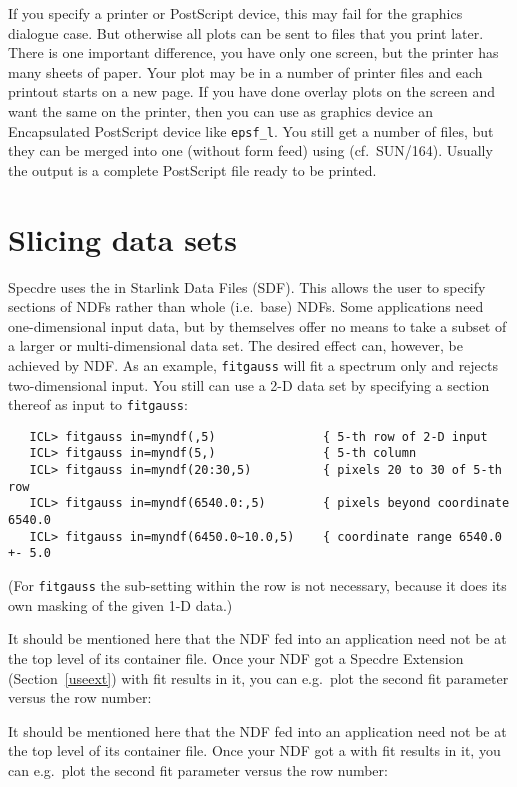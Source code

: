    If you specify a printer or PostScript device, this may fail for the
   graphics dialogue case.  But otherwise all plots can be sent to files
   that you print later.  There is one important difference, you have
   only one screen, but the printer has many sheets of paper.  Your plot
   may be in a number of printer files and each printout starts on a new
   page.  If you have done overlay plots on the screen and want the same
   on the printer, then you can use as graphics device an Encapsulated
   PostScript device like {\tt epsf\_l}.  You still get a number
   of files, but they can be merged into one (without form feed) using
{\tt{}}
   (cf.\ SUN/164).  Usually the output is a complete PostScript file
   ready to be printed.


\section{\label{slice}Slicing data sets}

   Specdre uses the
   in Starlink Data Files (SDF). This allows the user to specify
   sections of NDFs rather than whole (i.e.\ base) NDFs. Some
   applications need one-dimensional input data, but by themselves offer
   no means to take a subset of a larger or multi-dimensional data
   set. The desired effect can, however, be achieved by NDF. As an
   example, {\tt fitgauss} will fit a spectrum only and rejects
   two-dimensional input. You still can use a 2-D data set by specifying
   a section thereof as input to {\tt fitgauss}:

\begin{verbatim}
   ICL> fitgauss in=myndf(,5)               { 5-th row of 2-D input
   ICL> fitgauss in=myndf(5,)               { 5-th column
   ICL> fitgauss in=myndf(20:30,5)          { pixels 20 to 30 of 5-th row
   ICL> fitgauss in=myndf(6540.0:,5)        { pixels beyond coordinate 6540.0
   ICL> fitgauss in=myndf(6450.0~10.0,5)    { coordinate range 6540.0 +- 5.0
\end{verbatim}

   (For {\tt fitgauss} the sub-setting within the row is not necessary,
   because it does its own masking of the given 1-D data.)

\begin{latexonly}
   It should be mentioned here that the NDF fed into an application need
   not be at the top level of its container file. Once your NDF got a
   Specdre Extension
(Section~\ref{useext})
   with fit results in it, you can e.g.\ plot the second fit parameter
   versus the row number:
\end{latexonly}
\begin{htmlonly}
   It should be mentioned here that the NDF fed into an application need
   not be at the top level of its container file. Once your NDF got a
   with fit results in it, you can e.g.\ plot the second fit parameter
   versus the row number:
\end{htmlonly}

